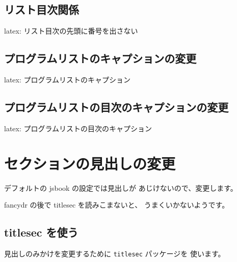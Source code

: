 \documentclass[dvipdfmx,a4j,14pt,uplatex,openany]{jsbook}
\begin{document}
\subsection{リスト目次関係}
\label{sec:org9934cdd}
\begin{programlist}[label={orgafd07bd}]{latex}{: リスト目次の先頭に番号を出さない}\makeatletter
\def\tcb@addcontentsline#1#2{%
  \ifx\kvtcb@listentry\@empty%
    \ifx\kvtcb@title\@empty%
      \ifx\tcbtitletext\@empty%
        \addcontentsline{#1}{#2}{{\ignorespaces\kvtcb@savedelimiter}}%
      \else%
        \addcontentsline{#1}{#2}{{\ignorespaces\tcbtitletext}}%
      \fi%
    \else%
      \addcontentsline{#1}{#2}{{\ignorespaces\kvtcb@title}}%
    \fi%
  \else%
    \addcontentsline{#1}{#2}{\kvtcb@listentry}%
  \fi%
}
\makeatother
\end{programlist}

\subsection{プログラムリストのキャプションの変更}
\label{sec:org9a2b606}
\begin{programlist}[label={orgc24da93}]{latex}{: プログラムリストのキャプション}\renewcommand\listingscaption{プログラムコード}
\end{programlist}

\subsection{プログラムリストの目次のキャプションの変更}
\label{sec:orgce4c783}
\begin{programlist}[label={orga0fa272}]{latex}{: プログラムリストの目次のキャプション}\renewcommand\listoflistingscaption{プログラムコードのリスト}
\end{programlist}





\section{セクションの見出しの変更}
\label{sec:org1b65439}
デフォルトの jsbook の設定では見出しが
あじけないので、変更します。

fancydr の後で titlesec を読みこまないと、
うまくいかないようです。

\subsection{titlesec を使う}
\label{sec:org5fecf51}
見出しのみかけを変更するために \texttt{titlesec} パッケージを
使います。
\end{document}
